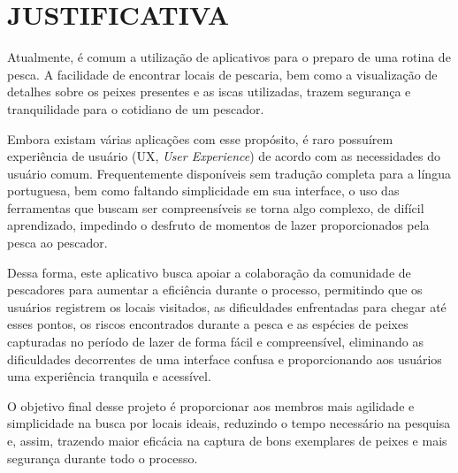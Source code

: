 \chapter{JUSTIFICATIVA}
\label{chap:justificativa}

Atualmente, é comum a utilização de aplicativos para o preparo de uma rotina de pesca. A facilidade de encontrar locais de pescaria, bem como a visualização de detalhes sobre os peixes presentes e as iscas utilizadas, trazem segurança e tranquilidade para o cotidiano de um pescador.

Embora existam várias aplicações com esse propósito, é raro possuírem experiência de usuário (UX, \textit{User Experience}) de acordo com as necessidades do usuário comum. Frequentemente disponíveis sem tradução completa para a língua portuguesa, bem como faltando simplicidade em sua interface, o uso das ferramentas que buscam ser compreensíveis se torna algo complexo, de difícil aprendizado, impedindo o desfruto de momentos de lazer proporcionados pela pesca ao pescador.

Dessa forma, este aplicativo busca apoiar a colaboração da comunidade de pescadores para aumentar a eficiência durante o processo, permitindo que os usuários registrem os locais visitados, as dificuldades enfrentadas para chegar até esses pontos, os riscos encontrados durante a pesca e as espécies de peixes capturadas no período de lazer de forma fácil e compreensível, eliminando as dificuldades decorrentes de uma interface confusa e proporcionando aos usuários uma experiência tranquila e acessível.

O objetivo final desse projeto é proporcionar aos membros mais agilidade e simplicidade na busca por locais ideais, reduzindo o tempo necessário na pesquisa e, assim, trazendo maior eficácia na captura de bons exemplares de peixes e mais segurança durante todo o processo.


